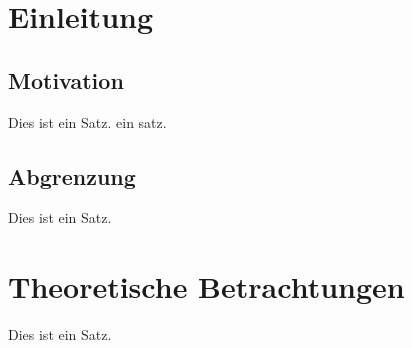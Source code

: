 \documentclass[a4paper, 11pt]{article}
\begin{document}
\tableofcontents

\newpage

\section{Einleitung}

	\subsection{Motivation}

	Dies ist ein Satz.
	ein satz.

	\subsection{Abgrenzung}

	Dies ist ein Satz.

	\newpage

\section{Theoretische Betrachtungen}

Dies ist ein Satz.

\end{document}
